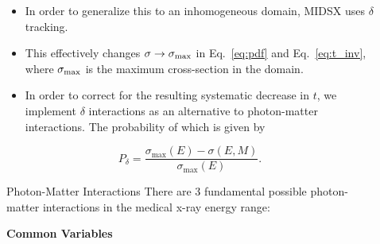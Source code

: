 \documentclass[final]{beamer}
\newlength{\sepwidth}
\newlength{\colwidth}
\newcommand{\separatorcolumn}{\begin{column}{\sepwidth}\end{column}}
\begin{document}
\begin{frame}[t]
\begin{columns}[t]
\begin{column}{\colwidth}
\end{column}

\separatorcolumn

\begin{column}{\colwidth}

  \begin{itemize}
    \item In order to generalize this to an inhomogeneous domain, MIDSX uses $\delta$ tracking.
    \item This effectively changes $\sigma \rightarrow \sigma_{\rm{max}}$ in Eq.~\ref{eq:pdf} and Eq.~\ref{eq:t_inv}, where $\sigma_{\rm{max}}$ is the maximum cross-section in the domain.
    \item In order to correct for the resulting systematic decrease in $t$, we implement $\delta$ interactions as an alternative to photon-matter interactions. The probability of which is given by 
  \end{itemize}
  \begin{equation}
    P_{\delta} = \frac{\sigma_{\text{max}}(E) - \sigma(E, M)}{\sigma_{\text{max}}(E)}.
  \end{equation}


  \begin{block}{Photon-Matter Interactions}
    There are 3 fundamental possible photon-matter interactions in the medical x-ray energy range:
    \begin{center}
      \textbf{Common Variables}
    \end{center}


\end{block}
\end{column}
\end{columns}
\end{frame}
\end{document}
